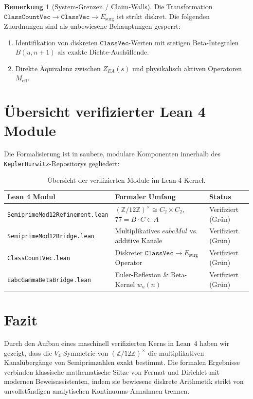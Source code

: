 \documentclass[11pt,a4paper]{article}
\theoremstyle{definition}
\newtheorem{remark}[theorem]{Bemerkung}
\begin{document}
	\begin{remark}[System-Grenzen / Claim-Walls]
		Die Transformation $\mathtt{ClassCountVec} \to \mathtt{ClassVec} \to E_{\mathrm{surg}}$ ist strikt diskret. Die folgenden Zuordnungen sind als unbewiesene Behauptungen gesperrt:
		\begin{enumerate}
			\item Identifikation von diskreten $\mathtt{ClassVec}$-Werten mit stetigen Beta-Integralen $B(u, n+1)$ als exakte Dichte-Aushüllende.
			\item Direkte Äquivalenz zwischen $Z_{EA}(s)$ und physikalisch aktiven Operatoren $M_{\mathrm{eff}}$.
		\end{enumerate}
	\end{remark}
	
	\section{Übersicht verifizierter Lean 4 Module}
	
	Die Formalisierung ist in saubere, modulare Komponenten innerhalb des \texttt{KeplerHurwitz}-Repositorys gegliedert:
	
	\begin{table}[h]
		\centering
		\small
		\begin{tabular}{lll}
			\toprule
			\textbf{Lean 4 Modul} & \textbf{Formaler Umfang} & \textbf{Status} \\
			\midrule
			\texttt{SemiprimeMod12Refinement.lean} & $(\mathbb{Z}/12\mathbb{Z})^\times \cong C_2 \times C_2$, $77 = B \cdot C \in A$ & Verifiziert (Grün) \\
			\texttt{SemiprimeMod12Bridge.lean} & Multiplikatives $eabcMul$ vs. additive Kanäle & Verifiziert (Grün) \\
			\texttt{ClassCountVec.lean} & Diskreter $\mathtt{ClassVec} \to E_{\mathrm{surg}}$ Operator & Verifiziert (Grün) \\
			\texttt{EabcGammaBetaBridge.lean} & Euler-Reflexion \& Beta-Kernel $w_u(n)$ & Verifiziert (Grün) \\
			\bottomrule
		\end{tabular}
		\caption{Übersicht der verifizierten Module im Lean 4 Kernel.}
	\end{table}
	
	\section{Fazit}
	
	Durch den Aufbau eines maschinell verifizierten Kerns in Lean~4 haben wir gezeigt, dass die $V_4$-Symmetrie von $(\mathbb{Z}/12\mathbb{Z})^\times$ die multiplikativen Kanalübergänge von Semiprimzahlen exakt bestimmt. Die formalen Ergebnisse verbinden klassische mathematische Sätze von Fermat und Dirichlet mit modernen Beweisassistenten, indem sie bewiesene diskrete Arithmetik strikt von unvollständigen analytischen Kontinuums-Annahmen trennen.
\end{document}
